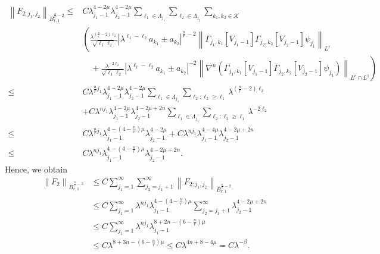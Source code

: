 \documentclass[a4paper,12pt,reqno]{amsart}
\theoremstyle{plain}
\theoremstyle{definition}
\newcommand{\dB}{\dot{B}}
\renewcommand{\leq}{\leqslant}
\renewcommand{\geq}{\geqslant}
\newcommand{\n}[1]{{\left\|#1\right\|}}
\begin{document}
\begin{align}
    \n{F_{2;j_1,j_2}}_{\dB_{r,1}^{\frac{n}{r}-2}}
    \leq{}&
    C\lambda_{j_1-1}^{4-2\mu}\lambda_{j_2-1}^{4-2\mu}
    \sum_{\ell_1 \in \Lambda_{j_1}}
    \sum_{\ell_2 \in \Lambda_{j_2}}
    \sum_{k_1, k_2 \in \mathcal{K}}
    \\
    &
    \left ( \frac{\lambda^{(\frac{n}{r}-2)\ell_2}}{\sqrt{\ell_1\ell_2}}
    |\lambda^{\ell_1-\ell_2}a_{k_1}\pm a_{k_2}|^{\frac{n}{r}-2}
    \n{\Gamma_{j_1,k_1}[V_{j_1-1}]
    \Gamma_{j_2,k_2}[V_{j_2-1}]
    \psi_{j_1}}_{L^r} \right. 
    \\
    & 
    \left. 
    \quad
    +
    \frac{\lambda^{-2\ell_2}}{\sqrt{\ell_1\ell_2}}
    |\lambda^{\ell_1-\ell_2}a_{k_1}\pm a_{k_2}|^{-2}
    \n{\nabla^n(\Gamma_{j_1,k_1}[V_{j_1-1}]
    \Gamma_{j_2,k_2}[V_{j_2-1}]
    \psi_{j_1})}_{L^r\cap L^1} \right)
    \\
    \leq{}&
    C
    \lambda^{\frac{n}{r}j_1}
    \lambda_{j_1-1}^{4-2\mu}\lambda_{j_2-1}^{4-2\mu}
    \sum_{\ell_1 \in \Lambda_{j_1}}
    \sum_{\ell_2 : \ell_2 \geq \ell_1}
    \lambda^{(\frac{n}{r}-2)\ell_2}
    \\
    &
    +
    C
    \lambda^{nj_1}
    \lambda_{j_1-1}^{4-2\mu}\lambda_{j_2-1}^{4-2\mu+2n}
    \sum_{\ell_1 \in \Lambda_{j_1}}
    \sum_{\ell_2: \ell_2 \geq \ell_1}
    \lambda^{-2\ell_2}
    \\
    \leq{}&
    C
    \lambda^{\frac{n}{r}j_1}
    \lambda_{j_1-1}^{4-(4-\frac{n}{r})\mu}\lambda_{j_2-1}^{4-2\mu}
    +
    C
    \lambda^{nj_1}
    \lambda_{j_1-1}^{4-4\mu}\lambda_{j_2-1}^{4-2\mu+2n}
    \\
    \leq{}&
    C
    \lambda^{nj_1}
    \lambda_{j_1-1}^{4-(4-\frac{n}{r})\mu}\lambda_{j_2-1}^{4-2\mu+2n}.
\end{align}
Hence, we obtain 
\begin{align}
    \n{F_{2}}_{\dB_{r,1}^{\frac{n}{r}-3}}
    &
    \leq
    C
    \sum_{j_1=1}^{\infty}
    \sum_{j_2=j_1+1}^{\infty}
    \n{F_{2;j_1,j_2}}_{\dB_{r,1}^{\frac{n}{r}-2}}
    \\
    &
    \leq
    C
    \sum_{j_1=1}^{\infty}
    \lambda^{nj_1}
    \lambda_{j_1-1}^{4-(4-\frac{n}{r})\mu}
    \sum_{j_2=j_1+1}^{\infty}
    \lambda_{j_2-1}^{4-2\mu+2n}
    \\
    &
    \leq
    C
    \sum_{j_1=1}^{\infty}
    \lambda^{nj_1}
    \lambda_{j_1-1}^{8+2n-(6-\frac{n}{r})\mu}
    \\
    &
    \leq
    C
    \lambda^{8+3n-(6-\frac{n}{r})\mu}
    \leq
    C
    \lambda^{4n+8-4\mu}
    =
    C\lambda^{-\beta}.
    \label{est:F2}
\end{align}
\end{document}
